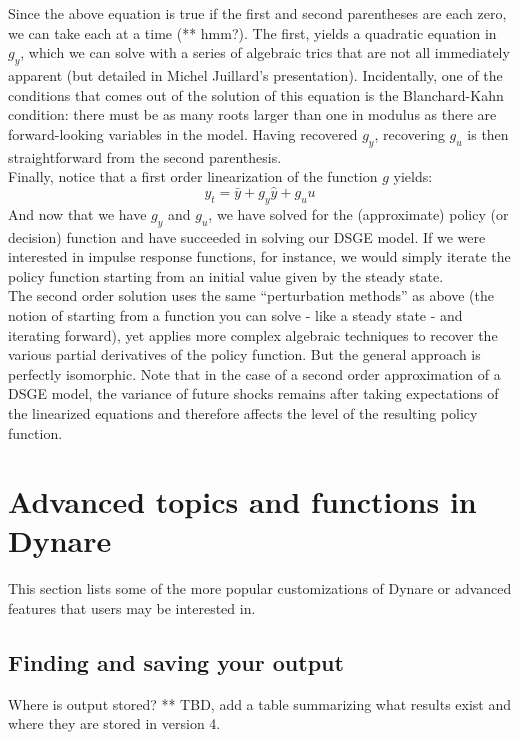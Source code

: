 Since the above equation is true if the first and second parentheses are each zero, we can take each at a time (** hmm?). The first, yields a quadratic equation  in $g_y$, which we can solve with a series of algebraic trics that are not all immediately apparent (but detailed in Michel Juillard's presentation). Incidentally, one of the conditions that comes out of the solution of this equation is the Blanchard-Kahn condition: there must be as many roots larger than one in modulus as there are forward-looking variables in the model. Having recovered $g_y$, recovering $g_u$ is then straightforward from the second parenthesis. \\

Finally, notice that a first order linearization of the function $g$ yields:
\[
y_t = \bar y+g_y\hat y+g_u u
\]
And now that we have $g_y$ and $g_u$, we have solved for the (approximate) policy (or decision) function and have succeeded in solving our DSGE model. If we were interested in impulse response functions, for instance, we would simply iterate the policy function starting from an initial value given by the steady state. \\

The second order solution uses the same ``perturbation methods'' as above (the notion of starting from a function you can solve - like a steady state - and iterating forward), yet applies more complex algebraic techniques to recover the various partial derivatives of the policy function. But the general approach is perfectly isomorphic. Note that in the case of a second order approximation of a DSGE model, the variance of future shocks remains after taking expectations of the linearized equations and therefore affects the level of the resulting policy function.\\

\section{Advanced topics and functions in Dynare}
This section lists some of the more popular customizations of Dynare or advanced features that users may be interested in. 

\subsection{Finding and saving your output}
Where is output stored? ** TBD, add a table summarizing what results exist and where they are stored in version 4. \\

